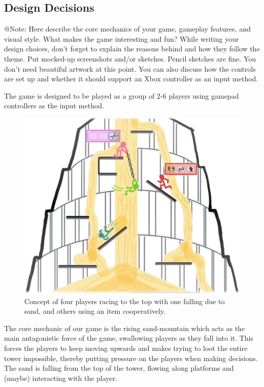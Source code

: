 \subsection{Design Decisions}

\begin{TempText}
	@Note: Here describe the core mechanics of your game, gameplay features, and visual style. What makes the game interesting and fun? While writing your design choices, don't forget to explain the reasons behind and how they follow the theme. Put mocked-up screenshots and/or sketches. Pencil sketches are fine. You don't need beautiful artwork at this point. You can also discuss how the controls are set up and whether it should support an Xbox controller as an input method.
\end{TempText}

The game is designed to be played as a group of 2-6 players using gamepad controllers as the input method.

\begin{figure}
    \centering
    \includegraphics{figures/topmeifyoucan_concept.jpg}
    \caption{Concept of four players racing to the top with one falling due to sand, and others using an item cooperatively.}
    \label{fig:concept}
\end{figure}

The core mechanic of our game is the rising sand-mountain which acts as the main antagonistic force of the game, swallowing players as they fall into it. This forces the players to keep moving upwards and makes trying to loot the entire tower impossible, thereby putting pressure on the players when making decisions. The sand is falling from the top of the tower, flowing along platforms and (maybe) interacting with the player.

